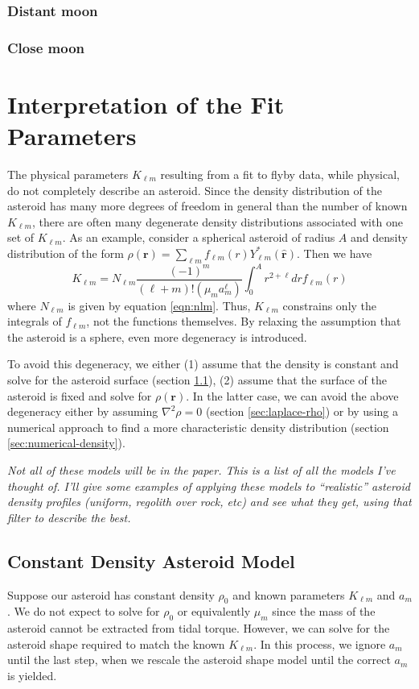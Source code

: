 \documentclass{aastex631}
\newcommand{\unit}[1]{\hat{\bm{#1}}}
\newcommand{\jtd}[1]{{\color{red}\textit{#1}}}
\begin{document}
\subsubsection{Distant moon}

\subsubsection{Close moon}




\section{Interpretation of the Fit Parameters}
The physical parameters $K_{\ell m}$ resulting from a fit to flyby data, while physical, do not completely describe an asteroid. Since the density distribution of the asteroid has many more degrees of freedom in general than the number of known $K_{\ell m}$, there are often many degenerate density distributions associated with one set of $K_{\ell m}$. As an example, consider a spherical asteroid of radius $A$ and density distribution of the form $\rho(\bm r) = \sum_{\ell m} f_{\ell m}(r) Y_{\ell m}^*(\unit r)$. Then we have
\begin{equation}
K_{\ell m} = N_{\ell m} \frac{(-1)^m}{(\ell + m)!(\mu_m a_m^\ell)}\int_0^A r^{2+\ell} dr f_{\ell m}(r)
\end{equation}
where $N_{\ell m}$ is given by equation \ref{eqn:nlm}. Thus, $K_{\ell m}$ constrains only the integrals of $f_{\ell m}$, not the functions themselves. By relaxing the assumption that the asteroid is a sphere, even more degeneracy is introduced.

To avoid this degeneracy, we either (1) assume that the density is constant and solve for the asteroid surface (section \ref{sec:constant-density}), (2) assume that the surface of the asteroid is fixed and solve for $\rho(\bm r)$. In the latter case, we can avoid the above degeneracy either by assuming $\nabla^2 \rho = 0$ (section \ref{sec:laplace-rho}) or by using a numerical approach to find a more characteristic density distribution (section \ref{sec:numerical-density}).

\jtd{Not all of these models will be in the paper. This is a list of all the models I've thought of. I'll give some examples of applying these models to ``realistic'' asteroid density profiles (uniform, regolith over rock, etc) and see what they get, using that filter to describe the best.}

\subsection{Constant Density Asteroid Model}
\label{sec:constant-density}
Suppose our asteroid has constant density $\rho_0$ and known parameters $K_{\ell m}$ and $a_m$. We do not expect to solve for $\rho_0$ or equivalently $\mu_m$ since the mass of the asteroid cannot be extracted from tidal torque. However, we can solve for the asteroid shape required to match the known $K_{\ell m}$. In this process, we ignore $a_m$ until the last step, when we rescale the asteroid shape model until the correct $a_m$ is yielded.
\end{document}

